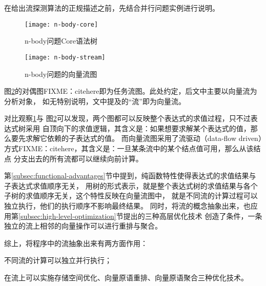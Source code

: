 在给出流探测算法的正规描述之前，先结合并行问题实例进行说明。
\begin{quotation}
\end{quotation}
\begin{figure}
  \centering
  \texttt{[image: n-body-core]}
  \caption{n-body问题Core语法树}
  \label{fig:n-body-core}
\end{figure}
\begin{figure}
  \centering
  \texttt{[image: n-body-stream]}
  \caption{n-body问题的向量流图}
  \label{fig:n-body-stream}
\end{figure}

图\ref{fig:n-body-stream}的对偶图FIXME：citehere即为任务流图。此处约定，后文中主要以向量流为分析对象，
如无特别说明，文中提及的“流”即为向量流。

对比观察\ref{fig:n-body-core}与
图\ref{fig:n-body-stream}可以发现，两个图都可以反映整个表达式的求值过程，只不过表达式树采用
自顶向下的求值逻辑，其含义是：如果想要求解某个表达式的值，那么要先求解它依赖的子表达式的值。
而向量流图采用了流驱动（data-flow driven）方式FIXME：citehere，其含义是：一旦某条流中的某个结点值可用，那么从该结点
分支出去的所有流都可以继续向前计算。

第\ref{subsec:functional-advantages}节中提到，纯函数特性使得表达式的求值结果与子表达式求值顺序无关，
用树的形式表示，就是整个表达式树的求值结果与各个子树的求值顺序无关，这个特性反映在向量流图中，
就是不同流的计算过程可以独立执行，他们的执行顺序不影响最终结果。
同时，将流的概念抽象出来，也应用第\ref{subsec:high-level-optimization}节提出的三种高层优化技术
创造了条件，一条独立的流上相邻的向量操作可以进行重排与聚合。

综上，将程序中的流抽象出来有两方面作用：
\begin{compactitem}
  \item 不同流的计算可以独立并行执行；
  \item 在流上可以实施存储空间优化、向量原语重排、向量原语聚合三种优化技术。
\end{compactitem}

